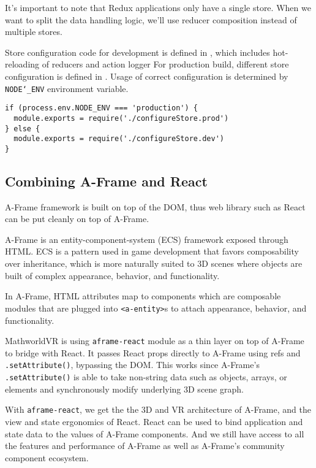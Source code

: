 It's important to note that Redux applications only have a single store. When we want to split the data handling logic, we'll use reducer composition instead of multiple stores.

Store configuration code for development is defined in , which includes hot-reloading of reducers and action logger For production build, different store configuration is defined in . Usage of correct configuration is determined by \texttt{NODE\char`_ENV} environment variable.

\begin{lstlisting}[caption={Loading store configuration dynamically.},captionpos=b]
if (process.env.NODE_ENV === 'production') {
  module.exports = require('./configureStore.prod')
} else {
  module.exports = require('./configureStore.dev')
}
\end{lstlisting}

\subsection{Combining A-Frame and React}
A-Frame framework is built on top of the DOM, thus web library such as React can be put cleanly on top of A-Frame. \cite{aframe-react}

A-Frame is an entity-component-system (ECS) framework exposed through HTML. ECS is a pattern used in game development that favors composability over inheritance, which is more naturally suited to 3D scenes where objects are built of complex appearance, behavior, and functionality. \cite{aframe-react}

In A-Frame, HTML attributes map to components which are composable modules that are plugged into \texttt{<a-entity>}s to attach appearance, behavior, and functionality. \cite{aframe-react}

MathworldVR is using \texttt{aframe-react} module as a thin layer on top of A-Frame to bridge with React. It passes React props directly to A-Frame using refs and \texttt{\justify .setAttribute()}, bypassing the DOM. This works since A-Frame's \texttt{\justify .setAttribute()} is able to take non-string data such as objects, arrays, or elements and synchronously modify underlying 3D scene graph. \cite{aframe-react}

With \texttt{aframe-react}, we get the the 3D and VR architecture of A-Frame, and the view and state ergonomics of React. React can be used to bind application and state data to the values of A-Frame components. And we still have access to all the features and performance of A-Frame as well as A-Frame's community component ecosystem. \cite{aframe-react}

